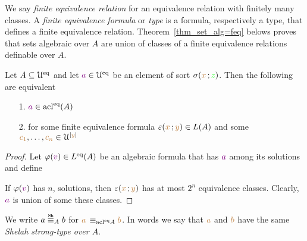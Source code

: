 \documentclass[creche.tex]{subfiles}
\begin{document}
We say \emph{finite equivalence relation\/} for an equivalence relation with finitely many classes. A \emph{finite equivalence formula\/} or \emph{type\/} is a formula, respectively a type, that defines a finite equivalence relation. Theorem~\ref{thm_set_alg=feq} belows proves that sets algebraic over $A$ are union of classes of a finite equivalence relations definable over $A$.


\begin{theorem}\label{thm_set_alg=feq}
Let $A\subseteq\EuScript U^{{\rm eq}}$ and let ${\color{violet} a}\in\EuScript U^{{\rm eq}}$ be an element of sort $\sigma({\color{brown} x}\,;{\color{green} z})$.  Then the following are equivalent
\begin{itemize}
\item[1.] ${\color{violet} a}\in\mathop{\rm acl}^{{\rm eq}}(A)$
\item[2.] for some finite equivalence formula $\varepsilon({\color{brown} x}\,;{\color{brown} y})\in L(A)$ and some ${\color{brown} c_1},\dots,{\color{brown} c_n}\in\EuScript U^{|{\color{brown} y}|}$
\end{itemize}


\end{theorem}
\begin{proof}
Let $\varphi({\color{violet} v})\in L^{{\rm eq}}(A)$ be an algebraic formula that has ${\color{violet} a}$ among its solutions and define


If $\varphi({\color{violet} v})$ has $n$, solutions, then $\varepsilon({\color{brown} x}\,;{\color{brown} y})$ has at most $2^n$ equivalence classes. Clearly, ${\color{violet} a}$ is union of some these classes.
\end{proof}

We write \emph{$a\stackrel{\smash{\scalebox{.5}{\rm\bf Sh}}}{\equiv}_Ab$} for ${\color{brown} a}\,\equiv_{\mathop{\rm acl}^{{\rm eq}}\! A}{\color{brown} b}$. In words we say that ${\color{brown} a}$ and ${\color{brown} b}$ have the same \emph{Shelah strong-type over $A$}.
\end{document}
